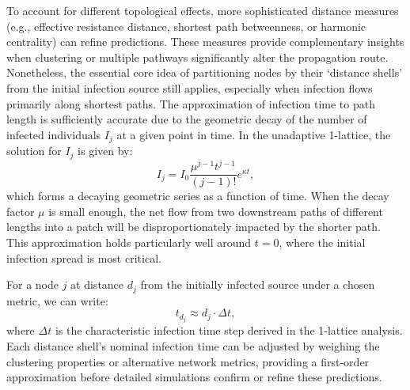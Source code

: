To account for different topological effects, more sophisticated distance measures (e.g., effective resistance distance, shortest path betweenness, or harmonic centrality) can refine predictions. These measures provide complementary insights when clustering or multiple pathways significantly alter the propagation route. Nonetheless, the essential core idea of partitioning nodes by their ‘distance shells’ from the initial infection source still applies, especially when infection flows primarily along shortest paths. The approximation of infection time to path length is sufficiently accurate due to the geometric decay of the number of infected individuals $I_j$ at a given point in time. In the unadaptive 1-lattice, the solution for $I_j$ is given by:
\[
I_j = I_0 \frac{\mu^{j-1} t^{j-1}}{(j-1)!} e^{\kappa t},
\]
which forms a decaying geometric series as a function of time. When the decay factor $\mu$ is small enough, the net flow from two downstream paths of different lengths into a patch will be disproportionately impacted by the shorter path. This approximation holds particularly well around $t=0$, where the initial infection spread is most critical.

For a node $j$ at distance $d_j$ from the initially infected source under a chosen metric, we can write:
\[
t_{d_j} \approx d_j \cdot \Delta t,
\]
where $\Delta t$ is the characteristic infection time step derived in the 1-lattice analysis. Each distance shell’s nominal infection time can be adjusted by weighing the clustering properties or alternative network metrics, providing a first-order approximation before detailed simulations confirm or refine these predictions.

